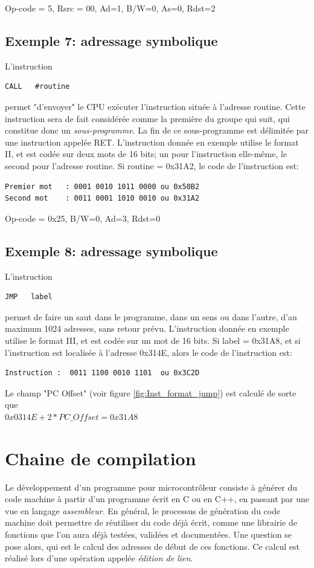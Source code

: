 Op-code = 5, Rsrc = 00, Ad=1, B/W=0, As=0, Rdst=2

\subsection{Exemple 7: adressage symbolique}
L'instruction
\lstset{style=customc}
\begin{lstlisting}
CALL   #routine
\end{lstlisting}
permet "d'envoyer" le CPU exécuter l'instruction située à l'adresse {\selectfont routine}. Cette instruction sera de fait considérée comme la première du groupe qui suit, qui constitue donc un \textit{sous-programme}. La fin de ce sous-programme est délimitée par une instruction appelée {\selectfont RET}.
L'instruction donnée en exemple utilise le format II, et est codée sur deux mots de 16 bits; un pour l'instruction elle-même, le second pour l'adresse {\selectfont routine}.
Si {\selectfont routine = 0x31A2}, le code de l'instruction est:
\lstset{style=customc}
\begin{lstlisting}
Premier mot   : 0001 0010 1011 0000	ou 0x50B2
Second mot    : 0011 0001 1010 0010 ou 0x31A2 
\end{lstlisting}

Op-code = 0x25, B/W=0, Ad=3, Rdst=0

\subsection{Exemple 8: adressage symbolique}
L'instruction
\lstset{style=customc}
\begin{lstlisting}
JMP   label
\end{lstlisting}
permet de faire un saut dans le programme, dans un sens ou dans l'autre, d'au maximum 1024 adresses, sans retour prévu.
L'instruction donnée en exemple utilise le format III, et est codée sur un mot de 16 bits.
Si {\selectfont label = 0x31A8}, et si l'instruction est localisée à l'adresse 0x314E, alors le code de l'instruction est:
\lstset{style=customc}
\begin{lstlisting}
Instruction :  0011 1100 0010 1101	ou 0x3C2D
\end{lstlisting}
Le champ "PC Offset" (voir figure \ref{fig:Inst_format_jump}) est calculé de sorte que\\
$0x0314E + 2*PC\_Offset = 0x31A8 $

\section{Chaine de compilation}
Le développement d'un programme pour microcontrôleur consiste à générer du code machine à partir d'un programme écrit en C ou en C++, en passant par une vue en langage \textit{assembleur}.
En général, le processus de génération du code machine doit permettre de réutiliser du code déjà écrit, comme une librairie de fonctions que l'on aura déjà testées, validées et documentées. Une question se pose alors, qui est le calcul des adresses de début de ces fonctions. Ce calcul est réalisé lors d'une opération appelée \textit{édition de lien}.

